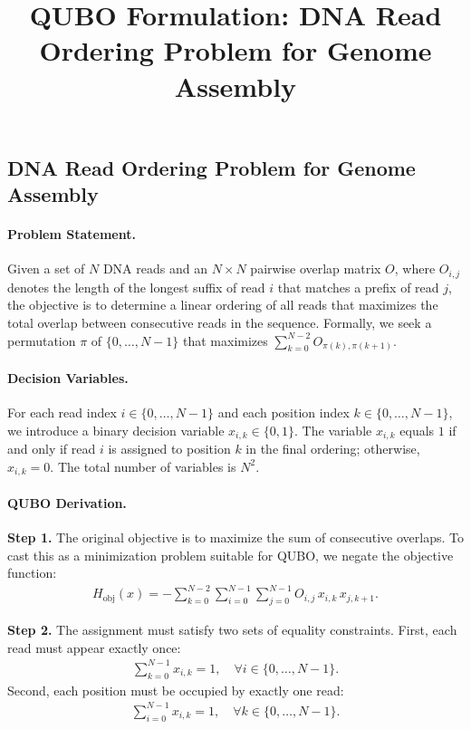 \documentclass[12pt]{article}
\title{QUBO Formulation: DNA Read Ordering Problem for Genome Assembly}
\date{}
\begin{document}
\maketitle

\subsection*{DNA Read Ordering Problem for Genome Assembly}

\paragraph{Problem Statement.}
Given a set of $N$ DNA reads and an $N \times N$ pairwise overlap matrix $O$, where $O_{i,j}$ denotes the length of the longest suffix of read $i$ that matches a prefix of read $j$, the objective is to determine a linear ordering of all reads that maximizes the total overlap between consecutive reads in the sequence. Formally, we seek a permutation $\pi$ of $\{0, \dots, N-1\}$ that maximizes $\sum_{k=0}^{N-2} O_{\pi(k), \pi(k+1)}$.

\paragraph{Decision Variables.}
For each read index $i \in \{0, \dots, N-1\}$ and each position index $k \in \{0, \dots, N-1\}$, we introduce a binary decision variable $x_{i,k} \in \{0,1\}$. The variable $x_{i,k}$ equals $1$ if and only if read $i$ is assigned to position $k$ in the final ordering; otherwise, $x_{i,k} = 0$. The total number of variables is $N^2$.

\paragraph{QUBO Derivation.}
\textbf{Step 1.} The original objective is to maximize the sum of consecutive overlaps. To cast this as a minimization problem suitable for QUBO, we negate the objective function:
\begin{align}
H_{\text{obj}}(x) = -\sum_{k=0}^{N-2} \sum_{i=0}^{N-1} \sum_{j=0}^{N-1} O_{i,j} \, x_{i,k} \, x_{j,k+1}.
\end{align}

\textbf{Step 2.} The assignment must satisfy two sets of equality constraints. First, each read must appear exactly once:
\begin{align}
\sum_{k=0}^{N-1} x_{i,k} = 1, \quad \forall i \in \{0, \dots, N-1\}.
\end{align}
Second, each position must be occupied by exactly one read:
\begin{align}
\sum_{i=0}^{N-1} x_{i,k} = 1, \quad \forall k \in \{0, \dots, N-1\}.
\end{align}
\end{document}
